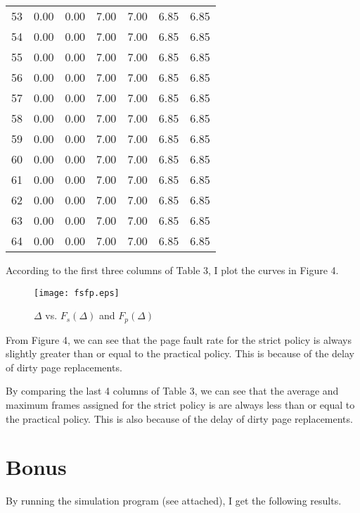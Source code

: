 \documentclass[12pt,letterpaper]{article}
\begin{document}
\begin{center}
\begin{longtable}{r|r|r|r|r|r|r}
53 & 0.00 & 0.00 & 7.00 & 7.00 & 6.85 & 6.85\\
54 & 0.00 & 0.00 & 7.00 & 7.00 & 6.85 & 6.85\\
55 & 0.00 & 0.00 & 7.00 & 7.00 & 6.85 & 6.85\\
56 & 0.00 & 0.00 & 7.00 & 7.00 & 6.85 & 6.85\\
57 & 0.00 & 0.00 & 7.00 & 7.00 & 6.85 & 6.85\\
58 & 0.00 & 0.00 & 7.00 & 7.00 & 6.85 & 6.85\\
59 & 0.00 & 0.00 & 7.00 & 7.00 & 6.85 & 6.85\\
60 & 0.00 & 0.00 & 7.00 & 7.00 & 6.85 & 6.85\\
61 & 0.00 & 0.00 & 7.00 & 7.00 & 6.85 & 6.85\\
62 & 0.00 & 0.00 & 7.00 & 7.00 & 6.85 & 6.85\\
63 & 0.00 & 0.00 & 7.00 & 7.00 & 6.85 & 6.85\\
64 & 0.00 & 0.00 & 7.00 & 7.00 & 6.85 & 6.85\\
\end{longtable}
\end{center}

According to the first three columns of Table 3, I plot the curves in Figure 4.

\begin{figure}
\begin{center}
\texttt{[image: fsfp.eps]}
\caption{$\Delta$ vs. $F_s(\Delta)$ and $F_p(\Delta)$}
\end{center}
\end{figure}

From Figure 4, we can see that the page fault rate for the strict policy is always slightly greater than or equal to the practical policy. This is because of the delay of dirty page replacements.

By comparing the last 4 columns of Table 3, we can see that the average and maximum frames assigned for the strict policy is are always less than or equal to the practical policy. This is also because of the delay of dirty page replacements.

\section*{Bonus}
By running the simulation program (see attached), I get the following results.
\end{document}
